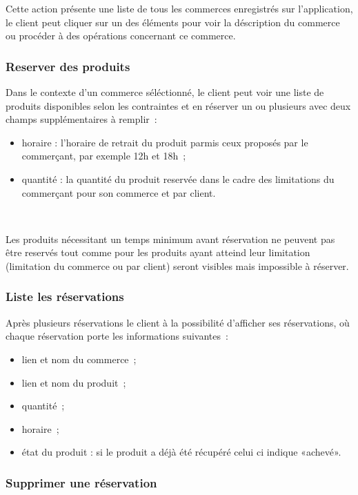 \documentclass[a4paper,12pt]{article}
\begin{document}
Cette action présente une liste de tous les commerces enregistrés sur l'application, le client peut cliquer sur un des éléments pour voir la déscription du commerce ou procéder à des opérations concernant ce commerce.

\subsubsection{Reserver des produits}

Dans le contexte d'un commerce séléctionné, le client peut voir une liste de produits disponibles selon les contraintes et en réserver un ou plusieurs avec deux champs supplémentaires à remplir~:

\begin{itemize}
	\item horaire : l'horaire de retrait du produit parmis ceux proposés par le commerçant, par exemple 12h et 18h~;
	\item quantité : la quantité du produit reservée dans le cadre des limitations du commerçant pour son commerce et par client.
\end{itemize} \

Les produits nécessitant un temps minimum avant réservation ne peuvent pas être reservés tout comme pour les produits ayant atteind leur limitation (limitation du commerce ou par client) seront visibles mais impossible à réserver.

\subsubsection{Liste les réservations}

Après plusieurs réservations le client à la possibilité d'afficher ses réservations, où chaque réservation porte les informations suivantes~:

\begin{itemize}
	\item lien et nom du commerce~;
	\item lien et nom du produit~;
	\item quantité~;
	\item horaire~;
	\item état du produit : si le produit a déjà été récupéré celui ci indique «achevé».
\end{itemize}


\subsubsection{Supprimer une réservation}
\end{document}
